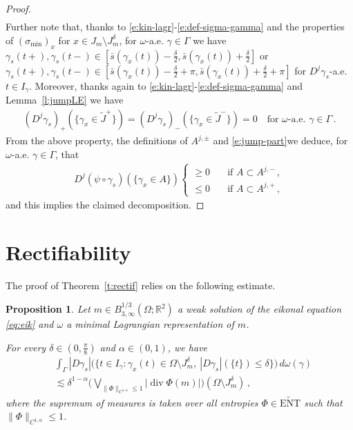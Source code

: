 \documentclass[fleqn
]{article}
\numberwithin{equation}{section}
\newcommand{\R}{{\mathbb R}}
\DeclareMathOperator{\dv}{div}
\newtheorem{prop}[thm]{Proposition}
\theoremstyle{definition}
\begin{document}
\begin{proof}
\begin{align}
\nonumber
\end{align}
Further note that, thanks to  \eqref{e:kin-lagr}-\eqref{e:def-sigma-gamma} and the properties of 
$(\sigma_{\min} )_x$ for $x\in J_m\setminus J_m^\delta$,
for $\omega$-a.e. $\gamma\in\Gamma$
 we have
$\gamma_s(t+),\gamma_s(t-)\in [ \bar s (\gamma_x(t))-\frac\delta2,  \bar s (\gamma_x(t))+\frac\delta2]$  or $\gamma_s(t+),\gamma_s(t-)\in [ \bar s (\gamma_x(t))-\frac\delta2+\pi ,  \bar s (\gamma_x(t))+\frac\delta2 + \pi]$ for $ D^j\gamma_s$-a.e. $t\in I_\gamma$.
%
Moreover, thanks again to \eqref{e:kin-lagr}-\eqref{e:def-sigma-gamma} and Lemma~\ref{l:jumpLE} we have
\begin{align*}
( D^j\gamma_s)_+(\{\gamma_x\in \tilde J^+\})=( D^j\gamma_s)_-(\{\gamma_x \in \tilde J^-\})=0\quad\text{for }\omega\text{-a.e. }\gamma\in\Gamma\,.
\end{align*}
%
From the above property, the definitions of $A^{j,\pm}$ and \eqref{e:jump-part}we deduce, for $\omega$-a.e. $\gamma\in\Gamma$, that
\begin{align*}
 D^j(\psi\circ \gamma_s)(\lbrace \gamma_x\in A\rbrace)
\begin{cases}
\geq 0\quad
&\text{if }A\subset  A^{j,-}\,,
\\
\leq 0\quad
&\text{if }A\subset  A^{j,+}\,,
\end{cases}
\end{align*}
and this implies the claimed decomposition.
\end{proof}


\section{Rectifiability}\label{s:rectif2}


The proof of Theorem~\ref{t:rectif} 
relies on the following estimate.


\begin{prop}\label{p:estim_small_jumps}
Let $m\in B^{1/3}_{3,\infty}(\Omega;\R^2)$ a weak solution of the eikonal equation \eqref{eq:eik} and $\omega$ a minimal  Lagrangian representation of $m$.

For every $\delta\in (0,\frac\pi8)$ and $\alpha\in (0,1)$, we have
\begin{align*}
&
\int_{\Gamma} 
|D\gamma_s|
\big(
\lbrace 
t\in I_\gamma\colon \gamma_x(t) \in \Omega \setminus J_m^\delta, \ 
|D\gamma_s|(\lbrace t\rbrace )\leq \delta\rbrace\big)
\,d\omega(\gamma)
\\
&
\lesssim \delta^{1-\alpha}
\bigg(\bigvee_{\|\Phi\|_{C^{1,\alpha}}\leq 1}|\dv\Phi(m)|\bigg)(\Omega \setminus J_m^\delta)\,,
\end{align*}
where the supremum of measures is taken over all entropies $\Phi\in\widetilde{\mathrm{ENT}}$ such that $\|\Phi\|_{C^{1,\alpha}}\leq 1$.
\end{prop}
\end{document}
